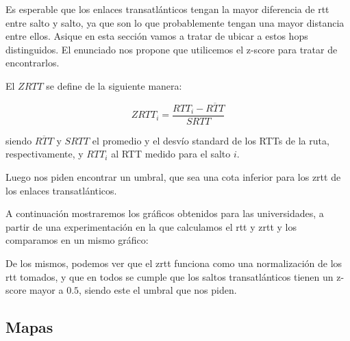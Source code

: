 Es esperable que los enlaces transatl\'anticos tengan la mayor diferencia de rtt entre salto y salto, ya que son lo que probablemente tengan una mayor distancia entre ellos. Asique en esta secci\'on vamos a tratar de ubicar a estos hops distinguidos. El enunciado nos propone que utilicemos el z-score para tratar de encontrarlos. 

El $ZRTT$ se define de la siguiente manera: 

\begin{equation}
 ZRTT_i = \frac{RTT_i - \overline{RTT}}{SRTT}
\end{equation}

siendo $\overline{RTT}$ y $SRTT$ el promedio y el desv\'io standard de los RTTs de la ruta, respectivamente, y $RTT_i$ al RTT medido para el salto $i$.

Luego nos piden encontrar un umbral, que sea una cota inferior para los zrtt de los enlaces transatl\'anticos. 

A continuaci\'on mostraremos los gr\'aficos obtenidos para las universidades, a partir de una experimentaci\'on en la que calculamos el rtt y zrtt y los comparamos en un mismo gr\'afico: 


De los mismos, podemos ver que el zrtt funciona como una normalizaci\'on de los rtt tomados, y que en todos se cumple que los saltos transatl\'anticos tienen un z-score mayor a $0.5$, siendo este el umbral que nos piden. 

\subsection{Mapas}

